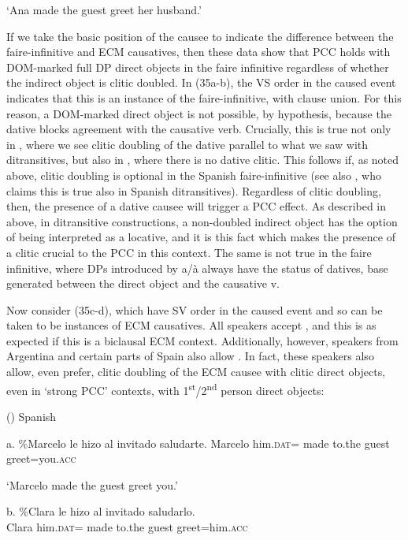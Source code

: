 \documentclass[output=paper,modfonts,nonflat]{langsci/langscibook}
\begin{document}
  ‘Ana made the guest greet her husband.’

If we take the basic position of the causee to indicate the difference between the faire-infinitive and ECM causatives, then these data show that PCC holds with DOM-marked full DP direct objects in the faire infinitive regardless of whether the indirect object is clitic doubled. In (35a-b), the VS order in the caused event indicates that this is an instance of the faire-infinitive, with clause union. For this reason, a DOM-marked direct object is not possible, by hypothesis, because the dative blocks agreement with the causative verb. Crucially, this is true not only in , where we see clitic doubling of the dative parallel to what we saw with ditransitives, but also in , where there is no dative clitic. This follows if, as noted above, clitic doubling is optional in the Spanish faire-infinitive (see also \citealt{Pineda2013}, who claims this is true also in Spanish ditransitives). Regardless of clitic doubling, then, the presence of a dative causee will trigger a PCC effect. As described in  above, in ditransitive constructions, a non-doubled indirect object has the option of being interpreted as a locative, and it is this fact which makes the presence of a clitic crucial to the PCC in this context. The same is not true in the faire infinitive, where DPs introduced by a/à always have the status of datives, base generated between the direct object and the causative v. 

Now consider (35c-d), which have SV order in the caused event and so can be taken to be instances of ECM causatives. All speakers accept , and this is as expected if this is a biclausal ECM context. Additionally, however, speakers from Argentina and certain parts of Spain also allow . In fact, these speakers also allow, even prefer, clitic doubling of the ECM causee with clitic direct objects, even in ‘strong PCC’ contexts, with 1\textsuperscript{st}/2\textsuperscript{nd} person direct objects:

()  Spanish 

a.   \%Marcelo   le   hizo   al   invitado saludarte.    Marcelo   him.\textsc{dat=}   made   to.the   guest  greet=you.\textsc{acc}

  ‘Marcelo made the guest greet you.’

b.   \%Clara   le   hizo   al   invitado   saludarlo.    \\
  Clara   him.\textsc{dat=} made   to.the   guest   greet=him.\textsc{acc}
\end{document}
